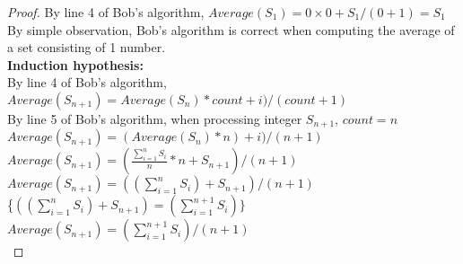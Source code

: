 \begin{problem}
\begin{proof}
      By line 4 of Bob's algorithm, $Average(S_1) = 0 \times 0 + S_1 / (0 + 1) = S_1$ \\
      By simple observation, Bob's algorithm is correct when computing the average of a set consisting of 1 number. \\
      \textbf{Induction hypothesis:} \\
      By line 4 of Bob's algorithm, $Average(S_{n+1}) = Average(S_n) * count + i) / (count + 1)$ \\
      By line 5 of Bob's algorithm, when processing integer $S_{n+1}$, $count = n$ \\
      $Average(S_{n+1}) = (Average(S_n) * n) + i) / (n+1)$ \\
      $Average(S_{n+1}) = (\frac{\sum_{i = 1}^{n} S_i}{n} * n + S_{n+1}) / (n+1)$ \\
      $Average(S_{n+1}) = ((\sum_{i = 1}^{n} S_i) + S_{n+1}) / (n + 1)$ \\
      \{$((\sum_{i = 1}^{n} S_i) + S_{n+1}) = (\sum_{i = 1}^{n+1} S_i)\}$ \\
      $Average(S_{n+1}) = (\sum_{i = 1}^{n+1} S_i) / (n + 1) $ \\
  \end{proof}
\end{problem}
